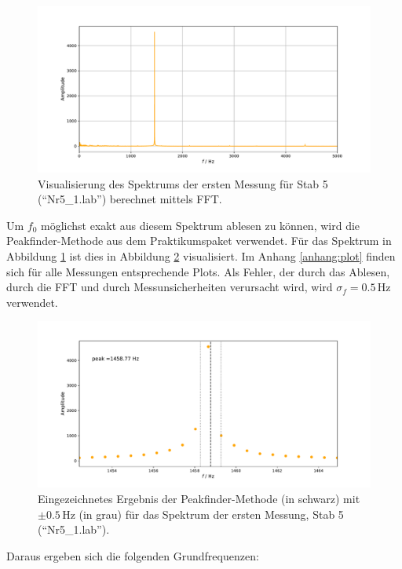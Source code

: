 \documentclass[a4paper, 12pt]{scrartcl}
\begin{document}
\begin{figure}[H]
	\centering
	\includegraphics[width=\linewidth]{plots/spektrum1.pdf}
	\caption{Visualisierung des Spektrums der ersten Messung für Stab 5 (\mbox{``Nr5\_1.lab''}) berechnet mittels FFT.}
	\label{pic:spektrum1}
\end{figure}

Um $f_0$ möglichst exakt aus diesem Spektrum ablesen zu können, wird die Peakfinder-Methode aus dem Praktikumspaket verwendet. Für das Spektrum in Abbildung \ref{pic:spektrum1} ist dies in Abbildung \ref{pic:spektrum2} visualisiert. Im Anhang \ref{anhang:plot} finden sich für alle Messungen entsprechende Plots. Als Fehler, der durch das Ablesen, durch die FFT und durch Messunsicherheiten verursacht wird, wird $\sigma_{f} = 0.5\,$Hz verwendet.

\begin{figure}[H]
	\centering
	\includegraphics[width=\linewidth]{plots/spektrum2.pdf}
	\caption{Eingezeichnetes Ergebnis der Peakfinder-Methode (in schwarz) mit $\pm0.5\,$Hz (in grau) für das Spektrum der ersten Messung, Stab 5 (\mbox{``Nr5\_1.lab''}).}
	\label{pic:spektrum2}
\end{figure}

Daraus ergeben sich die folgenden Grundfrequenzen:
\end{document}
